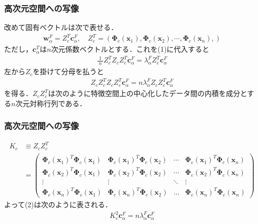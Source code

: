 \documentclass[dvipdfmx,cjk]{beamer}
\theoremstyle{example}
\begin{document}
\begin{frame}
    \frametitle{高次元空間への写像}
    改めて固有ベクトルは次で表せる．
    \begin{align*}
        \boldsymbol{w}_\alpha^F=Z_c^T\boldsymbol{c}_\alpha^F,\quad Z_c^T=\left(\boldsymbol{\Phi}_c(\boldsymbol{x}_1),\boldsymbol{\Phi}_c(\boldsymbol{x}_2),\cdots,\boldsymbol{\Phi}_c(\boldsymbol{x}_n),\right)\tag{3}
    \end{align*}
    ただし，$\boldsymbol{c}_\alpha^T$は$n$次元係数ベクトルとする．これを(1)に代入すると
    \begin{align*}
        \frac{1}{\;n\;}Z_c^TZ_cZ_c^T\boldsymbol{c}_\alpha^F=\lambda_\alpha^FZ_c^T\boldsymbol{c}_\alpha^F
    \end{align*}
    左から$Z_c$を掛けて分母を払うと
    \begin{align*}
        Z_cZ_c^TZ_cZ_c^T\boldsymbol{c}_\alpha^F=n\lambda_\alpha^FZ_cZ_c^T\boldsymbol{c}_\alpha^F\tag{2}
    \end{align*}
    を得る．$Z_cZ_c^T$は次のように特徴空間上の中心化したデータ間の内積を成分とする$n$次元対称行列である．
\end{frame}
\begin{frame}
    \frametitle{高次元空間への写像}
    \begin{align*}
        K_c & \equiv Z_cZ_c^T                                                                                                                                                                                                                                      \\
            & =\begin{pmatrix}
                   \boldsymbol{\Phi}_c(\boldsymbol{x}_1)^T\boldsymbol{\Phi}_c(\boldsymbol{x}_1) & \boldsymbol{\Phi}_c(\boldsymbol{x}_1)^T\boldsymbol{\Phi}_c(\boldsymbol{x}_2) & \cdots & \boldsymbol{\Phi}_c(\boldsymbol{x}_1)^T\boldsymbol{\Phi}_c(\boldsymbol{x}_n) \\
                   \boldsymbol{\Phi}_c(\boldsymbol{x}_2)^T\boldsymbol{\Phi}_c(\boldsymbol{x}_1) & \boldsymbol{\Phi}_c(\boldsymbol{x}_2)^T\boldsymbol{\Phi}_c(\boldsymbol{x}_2) & \cdots & \boldsymbol{\Phi}_c(\boldsymbol{x}_2)^T\boldsymbol{\Phi}_c(\boldsymbol{x}_n) \\
                   \vdots                                                                       & \vdots                                                                       & \ddots & \vdots                                                                       \\
                   \boldsymbol{\Phi}_c(\boldsymbol{x}_n)^T\boldsymbol{\Phi}_c(\boldsymbol{x}_1) & \boldsymbol{\Phi}_c(\boldsymbol{x}_n)^T\boldsymbol{\Phi}_c(\boldsymbol{x}_2) & \dots  & \boldsymbol{\Phi}_c(\boldsymbol{x}_n)^T\boldsymbol{\Phi}_c(\boldsymbol{x}_n)
               \end{pmatrix}
    \end{align*}
    よって(2)は次のように表される．
    \begin{align*}
        K_c^2\boldsymbol{c}_\alpha^F=n\lambda_\alpha^F\boldsymbol{c}_\alpha^F
    \end{align*}
\end{frame}
\end{document}
